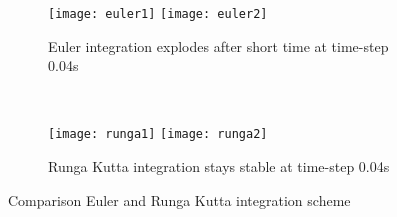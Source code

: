 \begin{figure}[!htbp]
  \begin{subfigure}[h]{\textwidth}
  \centering
    \texttt{[image: euler1]}
    \texttt{[image: euler2]}
    \caption{Euler integration explodes after short time at time-step 0.04s}
    \label{fig:euler}
  \end{subfigure}
  \\
  \begin{subfigure}[h]{\textwidth}
  \centering
    \texttt{[image: runga1]}
    \texttt{[image: runga2]}
    \caption{Runga Kutta integration stays stable at time-step 0.04s}
    \label{fig:ruga}
  \end{subfigure}

  \caption{Comparison Euler and Runga Kutta integration scheme}
  \label{fig:integration}
\end{figure}
